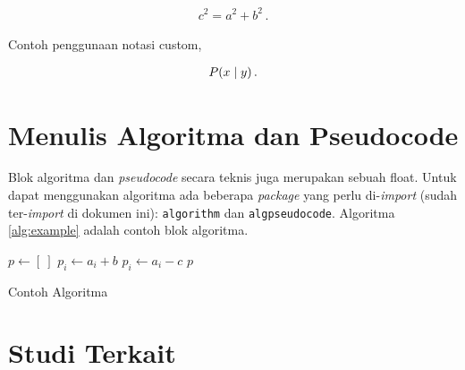 \documentclass[../index.tex]{subfiles}
\begin{document}
\begin{align}
	c^2 = a^2 + b^2\,.
	\label{eq:contoh_equation}
\end{align}

Contoh penggunaan notasi custom,

\begin{align}
	P(x \mid y)\,.
	\label{eq:contoh_equation_custom}
\end{align}

\section{Menulis Algoritma dan Pseudocode}

Blok algoritma dan \textit{pseudocode} secara teknis juga merupakan sebuah float. Untuk dapat menggunakan algoritma ada beberapa \textit{package} yang perlu di-\textit{import} (sudah ter-\textit{import} di dokumen ini): \texttt{algorithm} dan \texttt{algpseudocode}. Algoritma \ref{alg:example} adalah contoh blok algoritma.

\begin{algorithm}
	\begin{algorithmic}[1]
		\State $p \gets [~]$
		\State $p_i \gets a_i + b$
		\Else
		\State $p_i \gets a_i - c$
		\EndIf
		\EndFor
		\State \Return $p$
		\EndFunction
	\end{algorithmic}
	\caption{Contoh Algoritma}
	\label{alg:example}
\end{algorithm}

\section{Studi Terkait}
\blindtext
\end{document}
